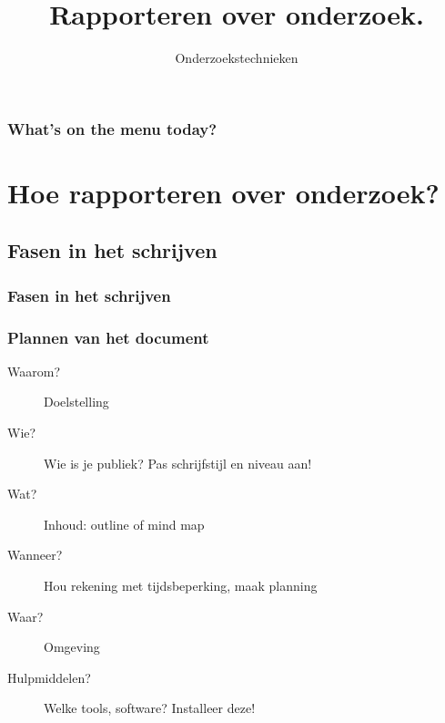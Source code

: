 \documentclass[aspectratio=169]{beamer}
\title{Rapporteren over onderzoek.}
\subtitle{Onderzoekstechnieken}
\begin{document}
\begin{frame}
  \maketitle
\end{frame}

\begin{frame}
  \frametitle{What's on the menu today?}
  
  \tableofcontents
\end{frame}


\section{Hoe rapporteren over onderzoek?}

\subsection{Fasen in het schrijven}

\begin{frame}
  \frametitle{Fasen in het schrijven}
  \centering
\end{frame}

\begin{frame}
  \frametitle{Plannen van het document}
  
  \begin{description}
    \item[Waarom?] Doelstelling
    \item[Wie?] Wie is je publiek? Pas schrijfstijl en niveau aan!
    \item[Wat?] Inhoud: outline of mind map
    \item[Wanneer?] Hou rekening met tijdsbeperking, maak planning
    \item[Waar?] Omgeving
    \item[Hulpmiddelen?] Welke tools, software? Installeer deze!
  \end{description}
\end{frame}
\end{document}
